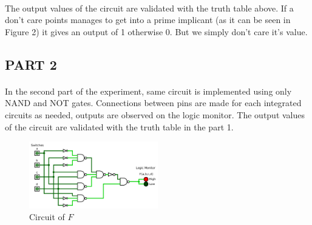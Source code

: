 \documentclass[pdftex,12pt,a4paper]{article}
\begin{document}
\begin{flushleft}
\paragraph{}
The output values of the circuit are validated with the truth table above. If a don't care points manages to get into a prime implicant (as it can be seen in Figure 2) it gives an output of 1 otherwise 0. But we simply don't care it's value.
\end{flushleft}

\begin{flushleft}
\newpage
\subsection{PART 2}
\paragraph{}
In the second part of the experiment, same circuit is implemented using only NAND and NOT gates. Connections between pins are made for each integrated circuits as needed, outputs are observed on the logic monitor. The output values of the circuit are validated with the truth table in the part 1. 

\begin{figure}[!h]
	\centering
	\includegraphics[width=0.5\textwidth]{part2.png}	
	\caption{Circuit of $F$}
	\label{part2}
\end{figure}




\end{flushleft}
\end{document}
